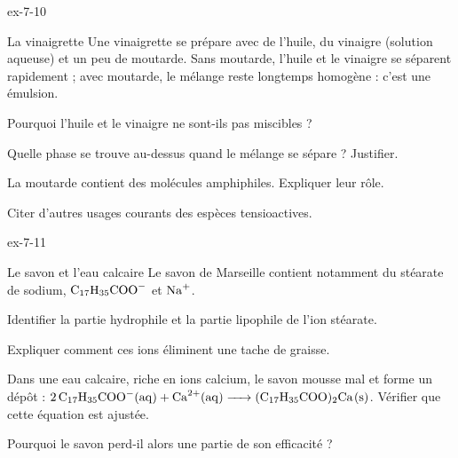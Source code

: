 \begin{blocLivre}{ex-7-10}
\begin{exercice}[2]{La vinaigrette}
Une vinaigrette se prépare avec de l'huile, du vinaigre (solution aqueuse) et un peu de moutarde. Sans moutarde, l'huile et
le vinaigre se séparent rapidement ; avec moutarde, le mélange reste longtemps homogène : c'est une émulsion.
\begin{questions}
\item Pourquoi l'huile et le vinaigre ne sont-ils pas miscibles ?
\item Quelle phase se trouve au-dessus quand le mélange se sépare ? Justifier.
\item La moutarde contient des molécules amphiphiles. Expliquer leur rôle.
\item Citer d'autres usages courants des espèces tensioactives.
\end{questions}
\end{exercice}
\end{blocLivre}
\begin{blocLivre}{ex-7-11}
\begin{exercice}[2]{Le savon et l'eau calcaire}
Le savon de Marseille contient notamment du stéarate de sodium, $\ce{C17H35COO-}$ et $\ce{Na+}$.
\begin{questions}
\item Identifier la partie hydrophile et la partie lipophile de l'ion stéarate.
\item Expliquer comment ces ions éliminent une tache de graisse.
\item Dans une eau calcaire, riche en ions calcium, le savon mousse mal et forme un dépôt : $\ce{2C17H35COO^{-}(aq) + Ca^{2+}(aq) -> (C17H35COO)2Ca(s)}$.
Vérifier que cette équation est ajustée.
\item Pourquoi le savon perd-il alors une partie de son efficacité ?
\end{questions}
\end{exercice}
\end{blocLivre}
